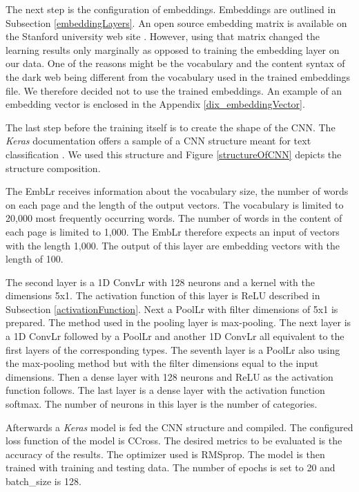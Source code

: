 The next step is the configuration of embeddings. Embeddings are outlined in Subsection \ref{embeddingLayers}. An open source embedding matrix is available on the Stanford university web site \cite{embeddings}. However, using that matrix changed the learning results only marginally as opposed to training the embedding layer on our data. One of the reasons might be the vocabulary and the content syntax of the dark web being different from the vocabulary used in the trained embeddings file. We therefore decided not to use the trained embeddings. An example of an embedding vector is enclosed in the Appendix \ref{dix_embeddingVector}.

The last step before the training itself is to create the shape of the CNN. The \textit{Keras} documentation offers a sample of a CNN structure meant for text classification \cite{kerasCNNStructure}. We used this structure and Figure \ref{structureOfCNN} depicts the structure composition. 

The EmbLr receives information about the vocabulary size, the number of words on each page and the length of the output vectors. The vocabulary is limited to 20,000 most frequently occurring words. The number of words in the content of each page is limited to 1,000. The EmbLr therefore expects an input of vectors with the length 1,000. The output of this layer are embedding vectors with the length of 100. 

The second layer is a 1D ConvLr with 128 neurons and a kernel with the dimensions 5x1. The activation function of this layer is ReLU described in Subsection \ref{activationFunction}. Next a PoolLr with filter dimensions of 5x1 is prepared. The method used in the pooling layer is max-pooling. The next layer is a 1D ConvLr followed by a PoolLr and another 1D ConvLr all equivalent to the first layers of the corresponding types. The seventh layer is a PoolLr also using the max-pooling method but with the filter dimensions equal to the input dimensions. Then a dense layer with 128 neurons and ReLU as the activation function follows. The last layer is a dense layer with the activation function softmax. The number of neurons in this layer is the number of categories.

Afterwards a \textit{Keras} model is fed the CNN structure and compiled. The configured loss function of the model is CCross. The desired metrics to be evaluated is the accuracy of the results. The optimizer used  is RMSprop. The model is then trained with training and testing data. The number of epochs is set to 20 and batch\_size is 128.

